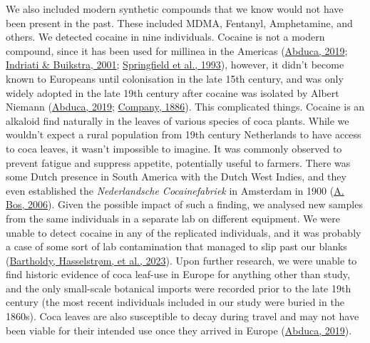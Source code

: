 \documentclass[
  letterpaper,
]{book}
\begin{document}
We also included modern synthetic compounds that we know would not have
been present in the past. These included MDMA, Fentanyl, Amphetamine,
and others. We detected cocaine in nine individuals. Cocaine is not a
modern compound, since it has been used for millinea in the Americas
(\protect\hyperlink{ref-abucaCocaTrade2019}{Abduca, 2019};
\protect\hyperlink{ref-indriatiCocaPrehistoric2001}{Indriati \&
Buikstra, 2001};
\protect\hyperlink{ref-springfieldCocaineMetabolites1993}{Springfield et
al., 1993}), however, it didn't become known to Europeans until
colonisation in the late 15th century, and was only widely adopted in
the late 19th century after cocaine was isolated by Albert Niemann
(\protect\hyperlink{ref-abucaCocaTrade2019}{Abduca, 2019};
\protect\hyperlink{ref-marianiCoca1886}{Company, 1886}). This
complicated things. Cocaine is an alkaloid find naturally in the leaves
of various species of coca plants. While we wouldn't expect a rural
population from 19th century Netherlands to have access to coca leaves,
it wasn't impossible to imagine. It was commonly observed to prevent
fatigue and suppress appetite, potentially useful to farmers. There was
some Dutch presence in South America with the Dutch West Indies, and
they even established the \emph{Nederlandsche Cocainefabriek} in
Amsterdam in 1900 (\protect\hyperlink{ref-bosHistoryLicit2006}{A. Bos,
2006}). Given the possible impact of such a finding, we analysed new
samples from the same individuals in a separate lab on different
equipment. We were unable to detect cocaine in any of the replicated
individuals, and it was probably a case of some sort of lab
contamination that managed to slip past our blanks
(\protect\hyperlink{ref-bartholdyMultiproxyAnalysis2023}{Bartholdy,
Hasselstrøm, et al., 2023}). Upon further research, we were unable to
find historic evidence of coca leaf-use in Europe for anything other
than study, and the only small-scale botanical imports were recorded
prior to the late 19th century (the most recent individuals included in
our study were buried in the 1860s). Coca leaves are also susceptible to
decay during travel and may not have been viable for their intended use
once they arrived in Europe
(\protect\hyperlink{ref-abucaCocaTrade2019}{Abduca, 2019}).
\end{document}
